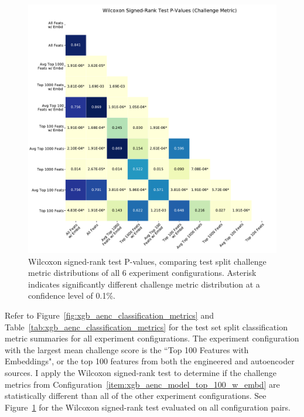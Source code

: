 \documentclass[\main/thesis.tex]{subfiles}
\begin{document}
\begin{figure}[t]
    \centering
    \includegraphics[width=12cm]{figure/xgb_aenc_wilcoxon_srt_p_vals.pdf}
    \caption[Wilcoxon signed-rank test P-values, comparing test split challenge metric distributions of all 6 experiment configurations.]{Wilcoxon signed-rank test P-values, comparing test split challenge metric distributions of all 6 experiment configurations. Asterisk indicates significantly different challenge metric distribution at a confidence level of 0.1\%.}
    \label{fig:xgb_aenc_wilcoxon_srt_p_vals}
\end{figure}

Refer to Figure~\ref{fig:xgb_aenc_classification_metrics} and Table~\ref{tab:xgb_aenc_classification_metrics} for the test set split classification metric summaries for all experiment configurations.
The experiment configuration with the largest mean challenge score is the ``Top 100 Features with Embeddings", or the top 100 features from both the engineered and autoencoder sources.
I apply the Wilcoxon signed-rank test to determine if the challenge metrics from Configuration~\ref{item:xgb_aenc_model_top_100_w_embd} are statistically different than all of the other experiment configurations.
See Figure~\ref{fig:xgb_aenc_wilcoxon_srt_p_vals} for the Wilcoxon signed-rank test evaluated on all configuration pairs.
\end{document}
